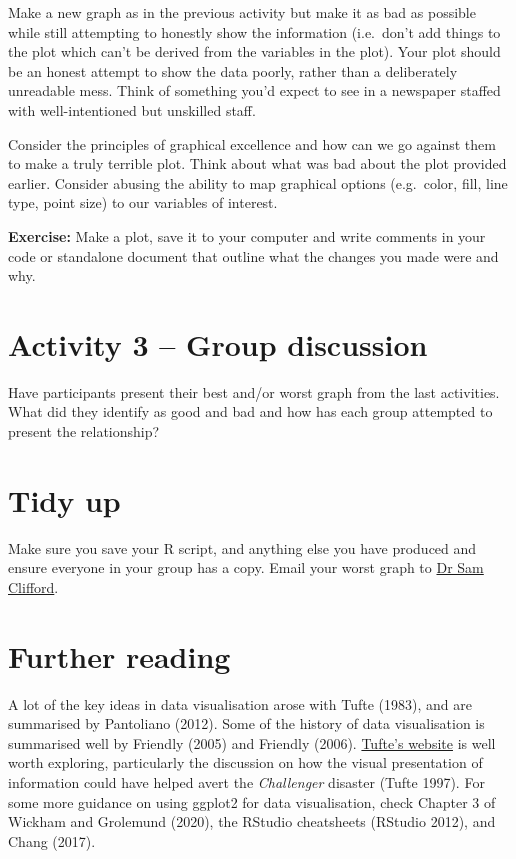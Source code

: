 \documentclass[
]{article}
\begin{document}
Make a new graph as in the previous activity but make it as bad as
possible while still attempting to honestly show the information
(i.e.~don't add things to the plot which can't be derived from the
variables in the plot). Your plot should be an honest attempt to show
the data poorly, rather than a deliberately unreadable mess. Think of
something you'd expect to see in a newspaper staffed with
well-intentioned but unskilled staff.

Consider the principles of graphical excellence and how can we go
against them to make a truly terrible plot. Think about what was bad
about the plot provided earlier. Consider abusing the ability to map
graphical options (e.g.~color, fill, line type, point size) to our
variables of interest.

\textbf{Exercise:} Make a plot, save it to your computer and write
comments in your code or standalone document that outline what the
changes you made were and why.

\hypertarget{activity-3-group-discussion}{%
\section{Activity 3 -- Group
discussion}\label{activity-3-group-discussion}}

Have participants present their best and/or worst graph from the last
activities. What did they identify as good and bad and how has each
group attempted to present the relationship?

\hypertarget{tidy-up}{%
\section{Tidy up}\label{tidy-up}}

Make sure you save your R script, and anything else you have produced
and ensure everyone in your group has a copy. Email your worst graph to
\href{mailto:sam.clifford@lshtm.ac.uk}{Dr Sam Clifford}.

\hypertarget{further-reading}{%
\section{Further reading}\label{further-reading}}

A lot of the key ideas in data visualisation arose with Tufte (1983),
and are summarised by Pantoliano (2012). Some of the history of data
visualisation is summarised well by Friendly (2005) and Friendly (2006).
\href{https://www.edwardtufte.com/tufte/}{Tufte's website} is well worth
exploring, particularly the discussion on how the visual presentation of
information could have helped avert the \emph{Challenger} disaster
(Tufte 1997). For some more guidance on using ggplot2 for data
visualisation, check Chapter 3 of Wickham and Grolemund (2020), the
RStudio cheatsheets (RStudio 2012), and Chang (2017).
\end{document}
